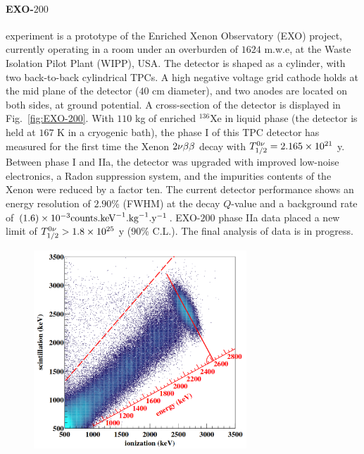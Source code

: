 \paragraph{EXO-$200$} experiment is a prototype of the Enriched Xenon Observatory (EXO) project, currently operating in a room under an overburden of $1624$ m.w.e, at the Waste Isolation Pilot Plant (WIPP), USA.
The detector is shaped as a cylinder, with two back-to-back cylindrical TPCs.
A high negative voltage grid cathode holds at the mid plane of the detector ($40$ cm diameter), and two anodes are located on both sides, at ground potential.
A cross-section of the detector is displayed in Fig.~\ref{fig:EXO-200}.
With $110$ kg of enriched $^{136}$Xe in liquid phase (the detector is held at $167$ K in a cryogenic bath), the phase I of this TPC detector has measured for the first time the Xenon $2\nu\beta\beta$ decay with $T_{1/2}^{0\nu}=2.165\times 10^{21}$ y.
Between phase I and IIa, the detector was upgraded with improved low-noise electronics, a Radon suppression system, and the impurities contents of the Xenon were reduced by a factor ten.
The current detector performance shows an energy resolution of $2.90$\% (FWHM) at the decay $Q$-value and a background rate of $(1.6)\times 10^{-3}\text{counts.keV}^{-1}\text{.kg}^{-1}\text{.y}^{-1}$.
EXO-$200$ phase IIa data placed a new limit of $T_{1/2}^{0\nu}>1.8\times 10^{25}$ y ($90$\% C.L.).
The final analysis of data is in progress.


\begin{figure}
  \centering
  \includegraphics[width=8cm]{neutrinophysics/fig_neutrinophysics/ionisation-to-scintillation_EXO-200.png}
  \caption{\label{fig:ratio_EXO-200}}

\end{figure}

